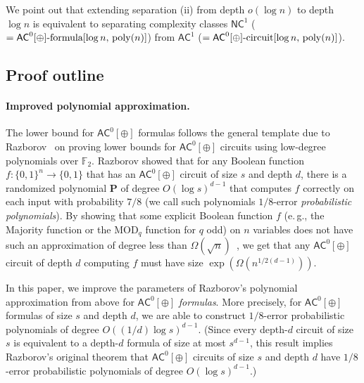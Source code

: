\documentclass[11pt]{article}
\numberwithin{equation}{section}
\theoremstyle{definition}
\theoremstyle{plain}
\newcommand{\cclass}[1]{\textsf{#1}}
\newcommand{\eg}{e.\,g.}
\newcommand{\mb}{\mathbf}
\newcommand{\F}{\mathbb{F}}
\newcommand{\AC}{\cclass{AC}}
\newcommand{\NC}{\cclass{NC}}
\begin{document}
We point out that extending separation (ii) from depth $o(\log n)$ to depth $\log n$ is equivalent to separating complexity classes $\NC^1$ ($= \AC^0[\oplus]\textup{-formula}[\log n,\,\mathrm{poly}(n)]$) from $\AC^1$ ($= \AC^0[\oplus]\textup{-circuit}[\log n,\,\mathrm{poly}(n)]$). 


\subsection{Proof outline}

\paragraph{Improved polynomial approximation.} The lower bound for $\AC^0[\oplus]$ formulas follows the general template due to Razborov~\cite{Razborov} on proving lower bounds for $\AC^0[\oplus]$ circuits using low-degree polynomials over $\F_2$. Razborov showed that for any Boolean function $f:\{0,1\}^n\rightarrow \{0,1\}$ that has an $\AC^0[\oplus]$ circuit of size $s$ and depth $d$, there is a randomized polynomial $\mb P$ of degree $O(\log s)^{d-1}$ that computes $f$ correctly on each input with probability ${7}/{8}$ (we call such polynomials $1/8$-error \emph{probabilistic polynomials}). By showing that some explicit Boolean function $f$ (\eg, the Majority function or the $\mathrm{MOD}_q$ function for $q$ odd) on $n$ variables does not have such an approximation of degree less than $\Omega(\sqrt{n})$~\cite{Razborov,Smolensky87,Szegedy1989,  %
Smolensky93}, we get that any $\AC^0[\oplus]$ circuit of depth $d$ computing $f$ must have size $\exp(\Omega(n^{1/2(d-1)}))$.

In this paper, we improve the parameters of Razborov's polynomial approximation from above for $\AC^0[\oplus]$ \emph{formulas}. More precisely, for $\AC^0[\oplus]$ formulas of size $s$ and depth $d$, we are able to construct $1/8$-error probabilistic polynomials of degree $O(({1}/{d})\log s)^{d-1}$. (Since every depth-$d$ circuit of size $s$ is equivalent to a depth-$d$ formula of size at most $s^{d-1}$, this result implies Razborov's original theorem that $\AC^0[\oplus]$ circuits of size $s$ and depth $d$ have $1/8$-error probabilistic polynomials of degree $O(\log s)^{d-1}$.)
\end{document}
